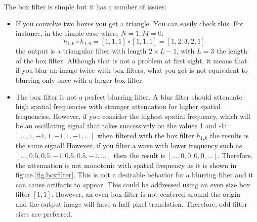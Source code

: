The box filter is simple but it has a number of issues:
\begin{itemize}
	\item {If you convolve two boxes you get a triangle. You can easily check this. For instance, in the simple case where $N=1, M=0$:
	      \begin{equation}
		      h_{1,0}  \circ h_{1,0} = \left[1, 1, 1\right] \circ \left[1, 1, 1\right] = \left[1,2,3,2,1\right]
	      \end{equation}
	      the output  is a triangular filter with length $2\times L-1$, with $L=3$ the length of the box filter. Although that is not a problem at first sight, it means that if you blur an image twice with box filters, what you get is not equivalent to blurring only once with a larger box filter. }

	\item {The box filter is not a perfect blurring filter. A blur filter should attenuate high spatial frequencies with stronger attenuation for higher spatial frequencies. However, if you consider the highest spatial frequency, which will be an oscillating signal that takes successively on the values 1 and -1: $\left[..., 1, -1, 1, -1, 1, -1, ... \right]$ when filtered with the box filter $h_{1,0}$ the results is the same signal! However, if you filter a wave with lower frequency such as $\left[..., 0.5, 0.5, -1, 0.5, 0.5, -1, ... \right]$ then the result is $\left[..., 0,0,0,0, ...\right]$. Therefore, the attenuation is not monotonic with spatial frequency as it is shown in figure \ref{fig:boxfilter}. This is not a desirable behavior for a blurring filter and it can cause artifacts to appear. This could be addressed using an even size box filter $\left[1,1 \right]$. However, an even box filter is not centered around the origin and the output image will have a half-pixel translation. Therefore, odd filter sizes are preferred.}
\end{itemize}


